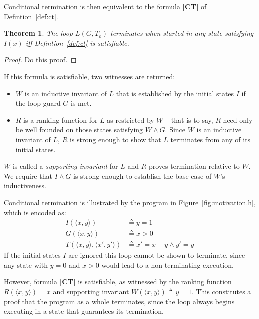 \documentclass[preprint]{sigplanconf}
\newtheorem{theorem}{Theorem}
\theoremstyle{definition}
\begin{document}
Conditional termination is then equivalent to the
formula {\bf [CT]} of Defintion~\ref{def:ct}.

\begin{theorem}
\label{thm:ct}
 The loop $L(G, T_o)$ terminates when started in any state satisfying $I(x)$ iff
 Defintion~\ref{def:ct} is satisfiable.
\end{theorem}

\begin{proof}
 Do this proof.
\end{proof}

If this formula is satisfiable, two witnesses are returned:
\begin{itemize}
\item $W$ is an inductive invariant of $L$ that is established by the initial states $I$ if the loop
guard $G$ is met.
\item $R$ is a ranking function for $L$ as restricted by $W$ -- that is to say, $R$ need only
be well founded on those states satisfying $W \wedge G$.  Since $W$ is an inductive invariant of $L$,
$R$ is strong enough to show that $L$ terminates from any of its initial states.
\end{itemize}

$W$ is called a \emph{supporting invariant} for $L$ and $R$ proves termination relative to $W$.
We require that $I \wedge G$ is strong enough to establish the base case of $W$'s inductiveness.

Conditional termination is illustrated by the program in Figure~\ref{fig:motivation.h},
which is encoded as:
\begin{align*}
            I(\langle x, y \rangle) & \triangleq y = 1 \\
            G(\langle x, y \rangle) & \triangleq x > 0 \\
            T(\langle x, y \rangle, \langle x', y' \rangle) & \triangleq x' = x - y \wedge y' = y 
\end{align*}
If the initial states $I$ are ignored this loop cannot be shown to terminate, since any state with $y = 0$ and $x > 0$
would lead to a non-terminating execution.

However, formula {\bf [CT]} is satisfiable, as witnessed by the ranking function
$R(\langle x,y\rangle) = x$ and supporting invariant $W(\langle x, y \rangle ) \triangleq y = 1$.
This constitutes a proof that the program as a whole terminates, since the loop always begins
executing in a state that guarantees its termination.\\
\end{document}
